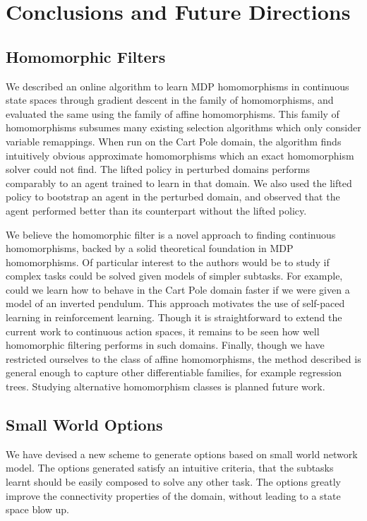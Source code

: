 \chapter{Conclusions and Future Directions}
\label{chap:conclusions}

\section{Homomorphic Filters}
We described an online algorithm to learn MDP homomorphisms in
continuous state spaces through gradient descent in the family of
homomorphisms, and evaluated the same using the family of affine
homomorphisms. This family of homomorphisms subsumes many existing
selection algorithms which only consider variable remappings. When run
on the Cart Pole domain, the algorithm finds intuitively obvious
approximate homomorphisms which an exact homomorphism solver could not
find. The lifted policy in perturbed domains performs comparably to an
agent trained to learn in that domain. We also used the lifted policy to
bootstrap an agent in the perturbed domain, and observed that the agent
performed better than its counterpart without the lifted policy.

We believe the homomorphic filter is a novel approach to finding
continuous homomorphisms, backed by a solid theoretical foundation in
MDP homomorphisms. Of particular interest to the authors would be to
study if complex tasks could be solved given models of simpler subtasks.
For example, could we learn how to behave in the Cart Pole domain faster
if we were given a model of an inverted pendulum. This approach
motivates the use of self-paced learning in reinforcement learning.
Though it is straightforward to extend the current work to continuous
action spaces, it remains to be seen how well homomorphic filtering
performs in such domains. Finally, though we have restricted ourselves
to the class of affine homomorphisms, the method described is general
enough to capture other differentiable families, for example regression
trees. Studying alternative homomorphism classes is planned future work.


\section{Small World Options}

We have devised a new scheme to generate options based on small world
network model. The options generated satisfy an intuitive criteria, that
the subtasks learnt should be easily composed to solve any other task.
The options greatly improve the connectivity properties of the domain,
without leading to a state space blow up. 

